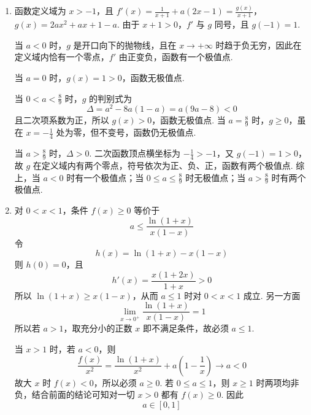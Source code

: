 \begin{solution}
\begin{enumerate}
\item 函数定义域为 \(x>-1\)，且
\(f'(x)=\frac1{x+1}+a(2x-1)=\frac{g(x)}{x+1}\)，\(g(x)=2ax^2+ax+1-a\).
由于 \(x+1>0\)，\(f'\) 与 \(g\) 同号，且 \(g(-1)=1\).

当 \(a<0\) 时，\(g\) 是开口向下的抛物线，且在 \(x\to+\infty\) 时趋于负无穷，因此在定义域内恰有一个零点，\(f'\) 由正变负，函数有一个极值点.

当 \(a=0\) 时，\(g(x)=1>0\)，函数无极值点.

当 \(0<a<\frac89\) 时，\(g\) 的判别式为
\[
\Delta=a^2-8a(1-a)=a(9a-8)<0
\]
且二次项系数为正，所以 \(g(x)>0\)，函数无极值点.
当 \(a=\frac89\) 时，\(g\geqslant0\)，虽在 \(x=-\frac14\) 处为零，但不变号，函数仍无极值点.

当 \(a>\frac89\) 时，\(\Delta>0\). 二次函数顶点横坐标为 \(-\frac14>-1\)，又 \(g(-1)=1>0\)，故 \(g\) 在定义域内有两个零点，符号依次为正、负、正，函数有两个极值点.
综上，当 \(a<0\) 时有一个极值点；当 \(0\leqslant a\leqslant\frac89\) 时无极值点；当 \(a>\frac89\) 时有两个极值点.
\item 对 \(0<x<1\)，条件 \(f(x)\geqslant0\) 等价于
\[
a\leqslant\frac{\ln(1+x)}{x(1-x)}
\]
令
\[
h(x)=\ln(1+x)-x(1-x)
\]
则 \(h(0)=0\)，且
\[
h'(x)=\frac{x(1+2x)}{1+x}>0
\]
所以 \(\ln(1+x)\geqslant x(1-x)\)，从而 \(a\leqslant1\) 时对 \(0<x<1\) 成立. 另一方面
\[
\lim_{x\to0^+}\frac{\ln(1+x)}{x(1-x)}=1
\]
所以若 \(a>1\)，取充分小的正数 \(x\) 即不满足条件，故必须 \(a\leqslant1\).

当 \(x>1\) 时，若 \(a<0\)，则
\[
\frac{f(x)}{x^2}=\frac{\ln(1+x)}{x^2}+a\left(1-\frac1x\right)\longrightarrow a<0
\]
故大 \(x\) 时 \(f(x)<0\)，所以必须 \(a\geqslant0\). 若 \(0\leqslant a\leqslant1\)，则 \(x\geqslant1\) 时两项均非负，结合前面的结论可知对一切 \(x>0\) 都有 \(f(x)\geqslant0\). 因此
\[
a\in[0,1]
\]
\end{enumerate}
\end{solution}
